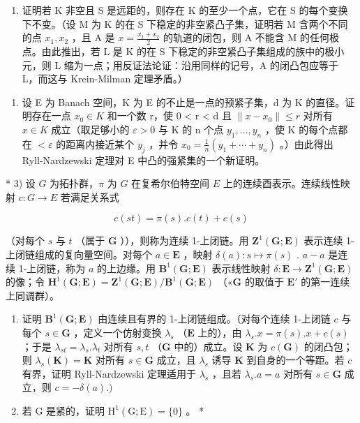 \begin{enumerate}
\def\labelenumi{\alph{enumi})}
\setcounter{enumi}{1}
\tightlist
\item
  证明若 K 非空且 S 是远距的，则存在 K 的至少一个点，它在 S 的每个变换下不变。（设 M 为 K 的在 S 下稳定的非空紧凸子集，证明若 M 含两个不同的点 \(x_{1}, x_{2}\) ，且 A 是 \(x = \frac{x_{1} + x_{2}}{2}\) 的轨道的闭包，则 A 不能含 M 的任何极点。由此推出，若 L 是 K 的在 S 下稳定的非空紧凸子集组成的族中的极小元，则 L 缩为一点；用反证法论证：沿用同样的记号，A 的闭凸包应等于 L，而这与 Krein-Milman 定理矛盾。）
\end{enumerate}

\begin{enumerate}
\def\labelenumi{\arabic{enumi})}
\setcounter{enumi}{1}
\tightlist
\item
  设 E 为 Banach 空间，K 为 E 的不止是一点的预紧子集，d 为 K 的直径。证明存在一点 \(x_{0} \in K\) 和一个数 r，使 0 \textless{} r \textless{} d 且 \(\|x - x_{0}\| \leqslant r\) 对所有 \(x \in K\) 成立（取足够小的 \(\varepsilon > 0\) 与 K 的 n 个点 \(y_{1}, \ldots, y_{n}\) ，使 K 的每个点都在 \(<\varepsilon\) 的距离内接近某个 \(y_{j}\) ，并令 \(x_{0} = \frac{1}{n}(y_{1} + \cdots + y_{n})\) 。）由此得出 Ryll-Nardzewski 定理对 E 中凸的强紧集的一个新证明。
\end{enumerate}

* 3) 设 \(G\) 为拓扑群，\(\pi\) 为 \(G\) 在复希尔伯特空间 \(E\) 上的连续酉表示。连续线性映射 \(c: G \to E\) 若满足关系式

\[
c (s t) = \pi (s). c (t) + c (s)
\]

（对每个 \(s\) 与 \(t\) （属于 \(\mathbf{G}\) ）），则称为连续 1-上闭链。用 \(\mathbf{Z}^{1}(\mathbf{G};\mathbf{E})\) 表示连续 1-上闭链组成的复向量空间。对每个 \(a\in\mathbf{E}\) ，映射 \(\delta(a):s\mapsto\pi(s)\) . \(a-a\) 是连续 1-上闭链，称为 \(a\) 的上边缘。用 \(\mathbf{B}^{1}(\mathbf{G};\mathbf{E})\) 表示线性映射 \(\delta:\mathbf{E}\to\mathbf{Z}^{1}(\mathbf{G};\mathbf{E})\) 的像；令 \(\mathbf{H}^{1}(\mathbf{G};\mathbf{E})=\mathbf{Z}^{1}(\mathbf{G};\mathbf{E})/\mathbf{B}^{1}(\mathbf{G};\mathbf{E})\) （«\(\mathbf{G}\) 的取值于 \(\mathbf{E}'\) 的第一连续上同调群）。

\begin{enumerate}
\def\labelenumi{\alph{enumi})}
\item
  证明 \(\mathbf{B}^1 (\mathbf{G};\mathbf{E})\) 由连续且有界的 1-上闭链组成。（对每个连续 1-上闭链 \(c\) 与每个 \(s\in \mathbf{G}\) ，定义一个仿射变换 \(\lambda_{s}\) （\(\mathbf{E}\) 上的），由 \(\lambda_{s}.x = \pi (s).x + c(s)\) ；于是 \(\lambda_{st} = \lambda_s.\lambda_t\) 对所有 \(s,t\) （\(\mathbf{G}\) 中的）成立。设 \(\mathbf{K}\) 为 \(c(\mathbf{G})\) 的闭凸包；则 \(\lambda_s(\mathbf{K}) = \mathbf{K}\) 对所有 \(s\in \mathbf{G}\) 成立，且 \(\lambda_{s}\) 诱导 \(\mathbf{K}\) 到自身的一个等距。若 \(c\) 有界，证明 Ryll-Nardzewski 定理适用于 \(\lambda_{s}\) ，且若 \(\lambda_{s}.a = a\) 对所有 \(s\in \mathbf{G}\) 成立，则 \(c = -\delta (a).)\)
\item
  若 G 是紧的，证明 \(\mathrm{H}^1 (\mathrm{G};\mathrm{E}) = \{0\}\) 。 *
\end{enumerate}

